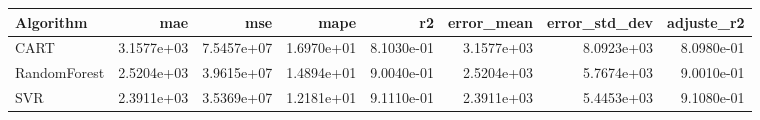 \begin{tabular}{lrrrrrrr}
\toprule
Algorithm & mae & mse & mape & r2 & error_mean & error_std_dev & adjuste_r2 \\
\midrule
CART & 3.1577e+03 & 7.5457e+07 & 1.6970e+01 & 8.1030e-01 & 3.1577e+03 & 8.0923e+03 & 8.0980e-01 \\
RandomForest & 2.5204e+03 & 3.9615e+07 & 1.4894e+01 & 9.0040e-01 & 2.5204e+03 & 5.7674e+03 & 9.0010e-01 \\
SVR & 2.3911e+03 & 3.5369e+07 & 1.2181e+01 & 9.1110e-01 & 2.3911e+03 & 5.4453e+03 & 9.1080e-01 \\
\bottomrule
\end{tabular}
